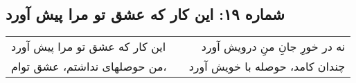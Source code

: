 \begin{center}
\section*{شماره ۱۹: این کار که عشق تو مرا پیش آورد}
\label{sec:019}
\begin{longtable}{l p{0.5cm} r}
این کار که عشق تو مرا پیش آورد
&&
نه در خورِ جانِ منِ درویش آورد
\\
من حوصلهای نداشتم، عشق توام،
&&
چندان کامد، حوصله با خویش آورد
\\
\end{longtable}
\end{center}
